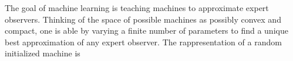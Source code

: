 \documentclass[../2.tex]{subfiles}
\begin{document}
    The goal of machine learning is teaching machines to approximate expert observers.
    Thinking of the space of possible machines as possibly convex and compact, one is able by varying a
    finite number of parameters to find a unique best approximation of any expert observer.
    The rappresentation of a random initialized machine is 
    
    \begin{defn}[relu]
    \end{defn}
    \begin{defn}
    \end{defn}
    \begin{defn}
    \end{defn}
    \begin{defn}
    \end{defn}
    \begin{defn}[CNN]
    \end{defn}
    \begin{defn}
    \end{defn}
\end{document}
